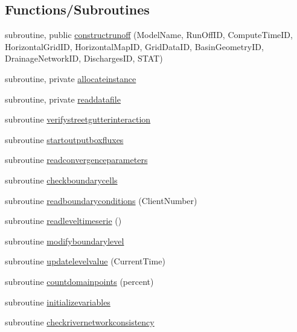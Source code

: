 \subsection*{Functions/\+Subroutines}
\begin{DoxyCompactItemize}
\item 
subroutine, public \mbox{\hyperlink{namespacemodulerunoff_afd5b620864c9f62a5b0258956c609766}{constructrunoff}} (Model\+Name, Run\+Off\+ID, Compute\+Time\+ID, Horizontal\+Grid\+ID, Horizontal\+Map\+ID, Grid\+Data\+ID, Basin\+Geometry\+ID, Drainage\+Network\+ID, Discharges\+ID, S\+T\+AT)
\item 
subroutine, private \mbox{\hyperlink{namespacemodulerunoff_a41e3ad5c7c0c951e239b6f330bf1dfec}{allocateinstance}}
\item 
subroutine, private \mbox{\hyperlink{namespacemodulerunoff_aa5edc73e0e11d57e48fd2c2b7dd60845}{readdatafile}}
\item 
subroutine \mbox{\hyperlink{namespacemodulerunoff_ae19f70ae654f145d09a7ca02839d4f11}{verifystreetgutterinteraction}}
\item 
subroutine \mbox{\hyperlink{namespacemodulerunoff_a94b297f6c1f0a65686f92178ebe5d5c2}{startoutputboxfluxes}}
\item 
subroutine \mbox{\hyperlink{namespacemodulerunoff_a82e45fea3cfee6af75a962d5a7d2224b}{readconvergenceparameters}}
\item 
subroutine \mbox{\hyperlink{namespacemodulerunoff_a56a143bff3b48f116a7cef30352f962e}{checkboundarycells}}
\item 
subroutine \mbox{\hyperlink{namespacemodulerunoff_ad906e87c7318e0ecc61ef60d8121f37c}{readboundaryconditions}} (Client\+Number)
\item 
subroutine \mbox{\hyperlink{namespacemodulerunoff_a16bc6313240379de466a61574c8dbc1d}{readleveltimeserie}} ()
\item 
subroutine \mbox{\hyperlink{namespacemodulerunoff_aac03c1526e1f45dcfe31d200ac141d7e}{modifyboundarylevel}}
\item 
subroutine \mbox{\hyperlink{namespacemodulerunoff_a420154ccf7d67c95702222f4b56fb5fa}{updatelevelvalue}} (Current\+Time)
\item 
subroutine \mbox{\hyperlink{namespacemodulerunoff_a6dee0b7b0f34390926e9ca24de451565}{countdomainpoints}} (percent)
\item 
subroutine \mbox{\hyperlink{namespacemodulerunoff_a99a2963d7ce8cb790b9fa53c6c936329}{initializevariables}}
\item 
subroutine \mbox{\hyperlink{namespacemodulerunoff_aea1e4fa9f8992257e2f3d4f38cd3953d}{checkrivernetworkconsistency}}

\end{DoxyCompactItemize}
